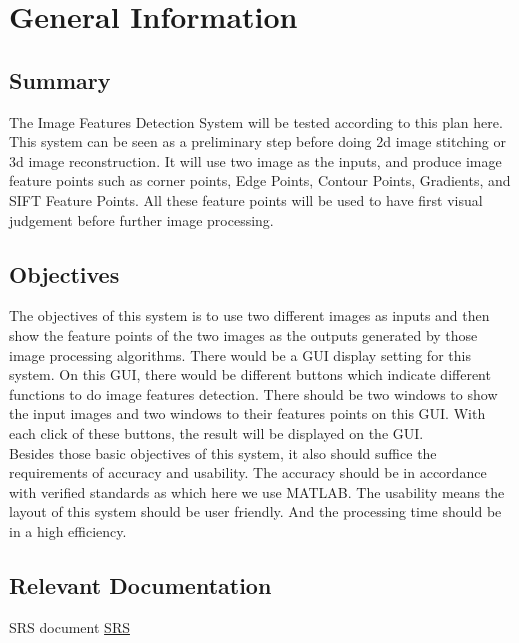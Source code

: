 \documentclass[12pt, titlepage]{article}
\begin{document}
\newpage


\section{General Information}

\subsection{Summary}

   The Image Features Detection System  will be tested according to this plan here. This system can be seen as a preliminary step before doing 2d image stitching or 3d image reconstruction. It will use two image as the inputs, and produce image feature points such as corner points, Edge Points, Contour Points, Gradients, and SIFT Feature Points. All these feature points will be used to have first visual judgement before further image processing.


\subsection{Objectives}


The objectives of this system is to use two different images as inputs and then show the feature points of the two images as the outputs generated by those image processing algorithms. There would be a GUI display setting for this system. On this GUI, there would be different buttons which indicate different functions to do image features detection. There should be two windows to show the input images and two windows to their features points on this GUI. With each click of these buttons, the result will be displayed on the GUI.\\

Besides those basic objectives of this system, it also should suffice the requirements of accuracy and usability. The accuracy should be in accordance with verified standards as which here we use MATLAB. The usability means the layout of this system should be user friendly. And the processing time should be in a high efficiency.

\subsection{Relevant Documentation}
SRS document
\href{https://github.com/Zhou4truth/imageFeatureDetection/blob/main/docs/SRS/Software%20Requriement%20Specifications.pdf}{SRS}
\end{document}
